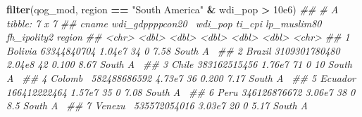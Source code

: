 \documentclass[]{book}
\newenvironment{Shaded}{\begin{snugshade}}{\end{snugshade}}
\newcommand{\CommentTok}[1]{\textcolor[rgb]{0.56,0.35,0.01}{\textit{#1}}}
\newcommand{\FloatTok}[1]{\textcolor[rgb]{0.00,0.00,0.81}{#1}}
\newcommand{\KeywordTok}[1]{\textcolor[rgb]{0.13,0.29,0.53}{\textbf{#1}}}
\newcommand{\NormalTok}[1]{#1}
\newcommand{\OperatorTok}[1]{\textcolor[rgb]{0.81,0.36,0.00}{\textbf{#1}}}
\newcommand{\StringTok}[1]{\textcolor[rgb]{0.31,0.60,0.02}{#1}}
\begin{document}
\begin{Shaded}
\begin{Highlighting}[]
\KeywordTok{filter}\NormalTok{(qog_mod, region }\OperatorTok{==}\StringTok{ "South America"} \OperatorTok{&}\StringTok{ }\NormalTok{wdi_pop }\OperatorTok{>}\StringTok{ }\FloatTok{10e6}\NormalTok{)}
\CommentTok{## # A tibble: 7 x 7}
\CommentTok{##   cname   wdi_gdppppcon20~ wdi_pop ti_cpi lp_muslim80 fh_ipolity2 region  }
\CommentTok{##   <chr>              <dbl>   <dbl>  <dbl>       <dbl>       <dbl> <chr>   }
\CommentTok{## 1 Bolivia      63344840704  1.04e7     34       0            7.58 South A~}
\CommentTok{## 2 Brazil     3109301780480  2.04e8     42       0.100        8.67 South A~}
\CommentTok{## 3 Chile       383162515456  1.76e7     71       0           10    South A~}
\CommentTok{## 4 Colomb~     582488686592  4.73e7     36       0.200        7.17 South A~}
\CommentTok{## 5 Ecuador     166412222464  1.57e7     35       0            7.08 South A~}
\CommentTok{## 6 Peru        346126876672  3.06e7     38       0            8.5  South A~}
\CommentTok{## 7 Venezu~     535572054016  3.03e7     20       0            5.17 South A~}


\end{Highlighting}
\end{Shaded}
\end{document}
